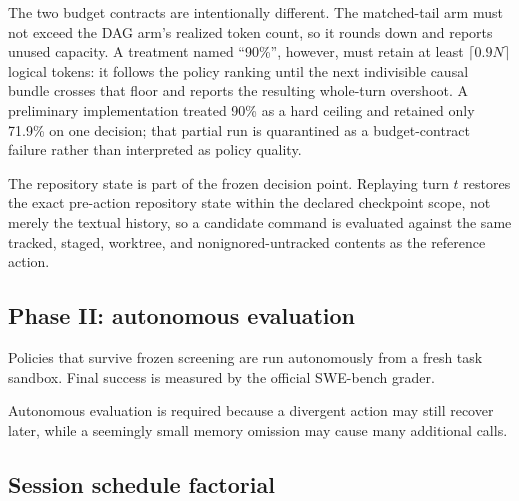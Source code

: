 \documentclass[11pt]{article}
\begin{document}
The two budget contracts are intentionally different.  The matched-tail arm
must not exceed the DAG arm's realized token count, so it rounds down and
reports unused capacity.  A treatment named ``90\%'', however, must retain at
least $\lceil0.9N\rceil$ logical tokens: it follows the policy ranking until the
next indivisible causal bundle crosses that floor and reports the resulting
whole-turn overshoot.  A preliminary implementation treated 90\% as a hard
ceiling and retained only 71.9\% on one decision; that partial run is
quarantined as a budget-contract failure rather than interpreted as policy
quality.

The repository state is part of the frozen decision point. Replaying turn $t$
restores the exact pre-action repository state within the declared checkpoint
scope, not merely the textual history, so a candidate command is evaluated
against the same tracked, staged, worktree, and nonignored-untracked contents as
the reference action.

\subsection{Phase II: autonomous evaluation}

Policies that survive frozen screening are run autonomously from a fresh task
sandbox. Final success is measured by the official SWE-bench grader.

Autonomous evaluation is required because a divergent action may still recover
later, while a seemingly small memory omission may cause many additional calls.

\subsection{Session schedule factorial}
\end{document}
